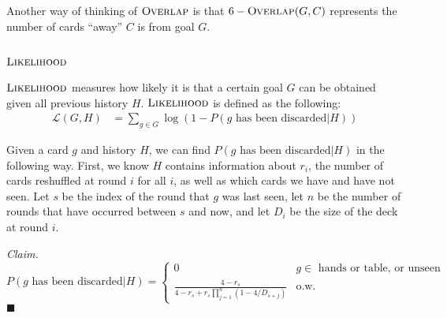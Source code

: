 \documentclass[11pt]{article}
\newcommand{\overlap}{\textsc{Overlap}}
\newcommand{\lkhd}{\textsc{Likelihood}}
\newenvironment{claim}[1]{\par\noindent\textit{Claim.}\space#1}{\hfill $\blacksquare$}
\begin{document}
Another way of thinking of $\overlap$ is that $6-\overlap(G,C)$ represents the number of cards ``away'' $C$ is from goal $G$.

\subsection{$\lkhd$}

$\lkhd$ measures how likely it is that a certain goal $G$ can be obtained given all previous history $H$. $\lkhd$ is defined as the following:
\begin{align}
  \mathcal{L}(G,H) &= \sum_{g \in G} \log(1 - P(g \text{ has been discarded}|H))
\end{align}

Given a card $g$ and history $H$, we can find $P(g \text{ has been discarded}|H)$ in the following way. First, we know $H$ contains information about $r_i$, the number of cards reshuffled at round $i$ for all $i$, as well as which cards we have and have not seen. Let $s$ be the index of the round that $g$ was last seen, let $n$ be the number of rounds that have occurred between $s$ and now, and let $D_i$ be the size of the deck at round $i$.

\begin{claim}
\begin{equation}
P(g \text{ has been discarded}|H) = \begin{cases}
  0 & g \in \text{ hands or table, or unseen} \\
  \frac{4-r_s}{4-r_s+r_s\prod_{j=1}^n(1-4/{D_{s+j}})} & \text{o.w.}
\end{cases}
\label{eq:p-discarded} \end{equation}
\end{claim}
\end{document}
